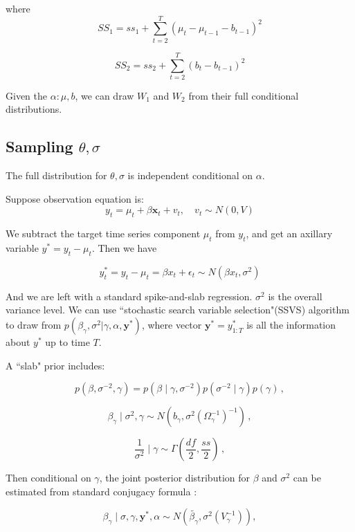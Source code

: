 where $$SS_1 = ss_1 + \sum_{t=2}^{T}(\mu_t - \mu_{t-1} - b_{t-1})^2$$

$$SS_2 = ss_2 + \sum_{t=2}^{T}(b_t - b_{t-1})^2$$

Given the $\alpha: \mu, b$, we can draw $W_{1}$ and $W_{2}$ from their full conditional distributions. 


\subsection{Sampling $\theta, \sigma$}

The full distribution for $\theta, \sigma$ is independent conditional on $\alpha$. 
 
Suppose observation equation is: 
 $$y_t = \mu_t + \beta \mathbf{x}_t + v_{t}, \quad v_{t} \sim N(0, V)$$  
 
  
 
We subtract the target time series component $\mu_t$ from $y_t$, and get an axillary variable $y^* = y_t - \mu_t$.  Then we have  
 
 
$$y_t^* = y_t - \mu_t = \beta x_t + \epsilon_t \sim N(\beta x_t, \sigma^2)$$
 


And we are left with a standard spike-and-slab regression.  $\sigma^{2}$ is the overall variance level. We can use ``stochastic search variable selection"(SSVS) algorithm to draw from $p(\beta_{\gamma}, \sigma^2 | \gamma, \alpha, \mathbf{y}^*)$, where vector $\mathbf{y}^* = y_{1:T}^*$ is all the information about $y^*$ up to time $T$.   
 
 
A ``slab" prior includes:


$$ p(\beta, \sigma^{-2},\gamma) = p(\beta \mid \gamma, \sigma^{-2})p(\sigma^{-2} \mid \gamma )p(\gamma)  \,  ,$$
  
 $$ \beta_{\gamma} \mid \sigma^{2} ,\gamma  \sim N(b_{\gamma}, \sigma^{2}(\Omega_{\gamma}^{-1})^{-1}) \,  ,$$
 
 
 $$\frac {1}{\sigma^{2}} \mid \gamma \sim  \Gamma(\frac{df}{2}, \frac{ss}{2})  \,  ,$$
 
 
Then conditional on $\gamma$, the joint posterior distribution for $\beta$ and $\sigma^2$ can be estimated from standard conjugacy formula \cite{Gelman2013} :   
 
 
 
 
 
 $$\beta_{\gamma} \mid \sigma, \gamma, \mathbf{y}^*, \alpha  \sim  N(\tilde{\beta_{\gamma}}, \sigma^2(V_{\gamma}^{-1})),$$  
 
 
 
